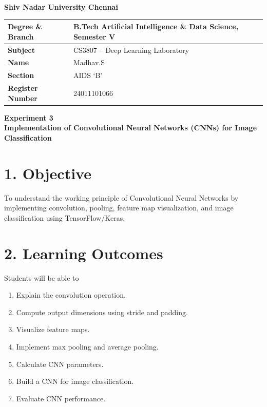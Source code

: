 \documentclass[11pt]{article}
\begin{document}
\begin{center}
{\LARGE\textbf{Shiv Nadar University Chennai}}\\[4mm]
\end{center}

\renewcommand{\arraystretch}{1.6}
\setlength{\tabcolsep}{10pt}

\begin{center}
\begin{tabular}{|p{4cm}|p{9.5cm}|}
\hline
\textbf{Degree \& Branch} & B.Tech Artificial Intelligence \& Data Science, Semester V \\ \hline
\textbf{Subject} & CS3807 -- Deep Learning Laboratory \\ \hline
\textbf{Name} & Madhav.S \\ \hline
\textbf{Section} & AIDS `B' \\ \hline
\textbf{Register Number} & 24011101066 \\ \hline
\end{tabular}
\end{center}

\vspace{5mm}

\begin{center}
{\Large\textbf{Experiment 3}}\\[1mm]
{\large\textbf{Implementation of Convolutional Neural Networks (CNNs) for Image Classification}}
\end{center}

\vspace{4mm}


\section*{1. Objective}

To understand the working principle of Convolutional Neural Networks by implementing convolution, pooling, feature map visualization, and image classification using TensorFlow/Keras.


\section*{2. Learning Outcomes}

Students will be able to

\begin{enumerate}[leftmargin=*]
\item Explain the convolution operation.
\item Compute output dimensions using stride and padding.
\item Visualize feature maps.
\item Implement max pooling and average pooling.
\item Calculate CNN parameters.
\item Build a CNN for image classification.
\item Evaluate CNN performance.
\end{enumerate}
\end{document}
